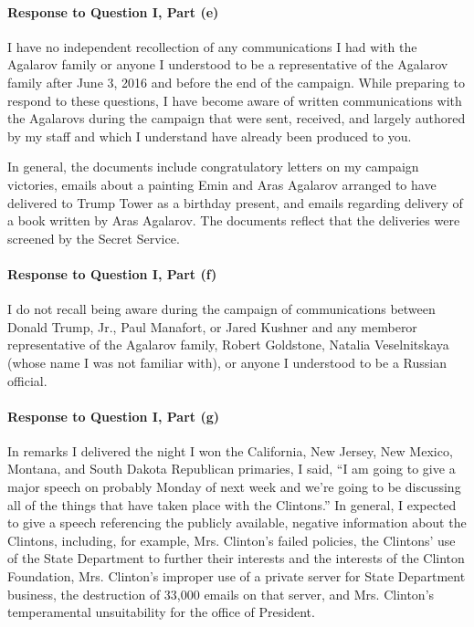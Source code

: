 \paragraph*{Response to Question I, Part (e)}

I have no independent recollection of any communications I had with the Agalarov family or anyone I understood to be a representative of the Agalarov family after June 3, 2016 and before the end of the campaign.
While preparing to respond to these questions, I have become aware of written communications with the Agalarovs during the campaign that were sent, received, and largely authored by my staff and which I understand have already been produced to you.

In general, the documents include congratulatory letters on my campaign victories, emails about a painting Emin and Aras Agalarov arranged to have delivered to Trump Tower as a birthday present, and emails regarding delivery of a book written by Aras Agalarov.
The documents reflect that the deliveries were screened by the Secret Service.

\paragraph*{Response to Question I, Part (f)}

I do not recall being aware during the campaign of communications between Donald Trump, Jr., Paul Manafort, or Jared Kushner and any memberor representative of the Agalarov family, Robert Goldstone, Natalia Veselnitskaya (whose name I was not familiar with), or anyone I understood to be a Russian official.

\paragraph*{Response to Question I, Part (g)}

In remarks I delivered the night I won the California, New Jersey, New Mexico, Montana, and South Dakota Republican primaries, I said, “I am going to give a major speech on probably Monday of next week and we're going to be discussing all of the things that have taken place with the Clintons.”
In general, I expected to give a speech referencing the publicly available, negative information about the Clintons, including, for example, Mrs. Clinton’s failed policies, the Clintons’ use of the State Department to further their interests and the interests of the Clinton Foundation, Mrs. Clinton’s improper use of a private server for State Department business, the destruction of 33,000 emails on that server, and Mrs. Clinton’s temperamental unsuitability for the office of President.

